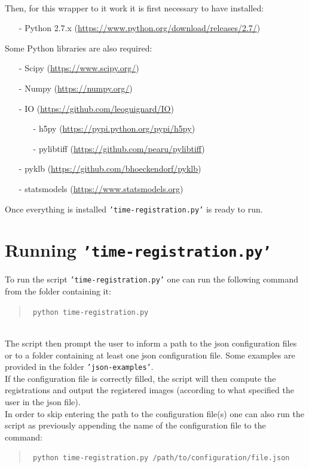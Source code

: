 \documentclass[10pt,a4paper]{article}
\newcommand{\option}[1]{{\texttt{'#1'}}}
\newenvironment{code}[1]{\mbox{}\\[1ex]\hspace*{-#1cm}\begin{minipage}{150mm}\begin{quote}\tt}{\end{quote}\end{minipage}\mbox{}\\[1ex]}
\begin{document}
\paragraph{}Then, for this wrapper to it work it is first necessary to have installed:
\begin{enumerate}
\item[-] Python 2.7.x (\url{https://www.python.org/download/releases/2.7/})
\end{enumerate}
Some Python libraries are also required:
\begin{enumerate}
\item[-] Scipy (\url{https://www.scipy.org/})
\item[-] Numpy (\url{https://numpy.org/})
\item[-] IO (\url{https://github.com/leoguignard/IO})
\begin{enumerate}
\item[-] h5py (\url{https://pypi.python.org/pypi/h5py})
\item[-] pylibtiff (\url{https://github.com/pearu/pylibtiff})
\end{enumerate}
\item[-] pyklb (\url{https://github.com/bhoeckendorf/pyklb})
\item[-] statsmodels (\url{https://www.statsmodels.org})
\end{enumerate}
Once everything is installed \option{time-registration.py} is ready to run.
\section{Running \option{time-registration.py}}
To run the script \option{time-registration.py} one can run the following command from the folder containing it:
\begin{code}{0.8}
\$ python time-registration.py
\end{code}
The script then prompt the user to inform a path to the json configuration files or to a folder containing at least one json configuration file. Some examples are provided in the folder \option{json-examples}.\\
If the configuration file is correctly filled, the script will then compute the registrations and output the registered images (according to what specified the user in the json file).\\
In order to skip entering the path to the configuration file(s) one can also run the script as previously appending the name of the configuration file to the command:
\begin{code}{0.8}
\$ python time-registration.py /path/to/configuration/file.json
\end{code}
\end{document}
